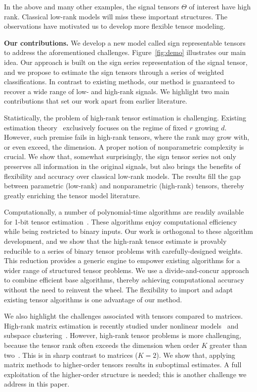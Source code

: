 \documentclass{article}
\theoremstyle{plain}
\theoremstyle{definition}
\begin{document}
In the above and many other examples, the signal tensors $\Theta$ of interest have high rank. Classical low-rank models will miss these important structures. The observations have motivated us to develop more flexible tensor modeling. 


{\bf Our contributions.} We develop a new model called sign representable tensors to address the aforementioned challenges. 
Figure~\ref{fig:demo} illustrates our main idea. Our approach is built on the sign series representation of the signal tensor, and we propose to estimate the sign tensors through a series of weighted classifications. In contrast to existing methods, our method is guaranteed to recover a wide range of low- and high-rank signals. We highlight two main contributions that set our work apart from earlier literature. 

Statistically, the problem of high-rank tensor estimation is challenging. Existing estimation theory~\citep{anandkumar2014tensor,montanari2018spectral,cai2019nonconvex} exclusively focuses on the regime of fixed $r$ growing $d$. However, such premise fails in high-rank tensors, where the rank may grow with, or even exceed, the dimension. A proper notion of nonparametric complexity is crucial. We show that, somewhat surprisingly, the sign tensor series not only preserves all information in the original signals, but also brings the benefits of flexibility and accuracy over classical low-rank models. The results fill the gap between parametric (low-rank) and nonparametric (high-rank) tensors, thereby greatly enriching the tensor model literature. 

Computationally, a number of polynomial-time algorithms are readily available for 1-bit tensor estimation~\cite{wang2018learning, han2020optimal, ghadermarzy2018learning}. These algorithms enjoy computational efficiency while being restricted to binary inputs. Our work is orthogonal to these algorithm development, and we show that the high-rank tensor estimate is provably reducible to a series of binary tensor problems with carefully-designed weights. This reduction provides a generic engine to empower existing algorithms for a wider range of structured tensor problems. We use a divide-and-concur approach to combine efficient base algorithms, thereby achieving computational accuracy without the need to reinvent the wheel. The flexibility to import and adapt existing tensor algorithms is one advantage of our method. 

We also highlight the challenges associated with tensors compared to matrices. High-rank matrix estimation is recently studied under nonlinear models~\citep{ganti2015matrix} and subspace clustering~\citep{pmlr-v70-ongie17a,fan2019online}. However, high-rank tensor problems is more challenging, because the tensor rank often exceeds the dimension when order $K$ greater than two~\citep{anandkumar2017analyzing}. This is in sharp contrast to matrices ($K=2$). We show that, applying matrix methods to higher-order tensors results in suboptimal estimates. A full exploitation of the higher-order structure is needed; this is another challenge we address in this paper.
\end{document}
